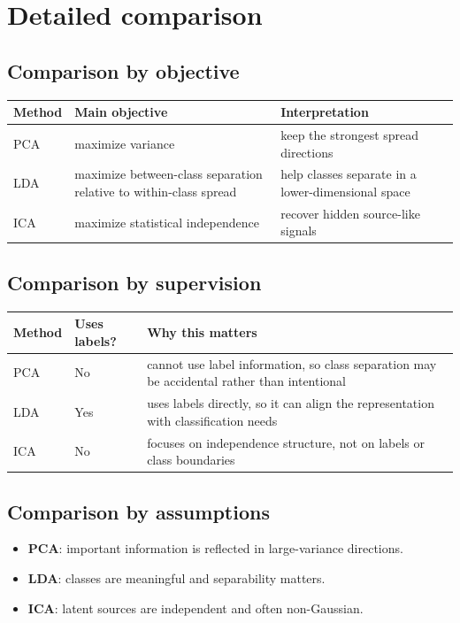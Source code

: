 \documentclass[11pt]{article}
\begin{document}
\section{Detailed comparison}
\subsection{Comparison by objective}
\begin{center}
\begin{tabular}{p{2.2cm}p{5.2cm}p{5.2cm}}
\toprule
\textbf{Method} & \textbf{Main objective} & \textbf{Interpretation} \\
\midrule
PCA & maximize variance & keep the strongest spread directions \\
LDA & maximize between-class separation relative to within-class spread & help classes separate in a lower-dimensional space \\
ICA & maximize statistical independence & recover hidden source-like signals \\
\bottomrule
\end{tabular}
\end{center}

\subsection{Comparison by supervision}
\begin{center}
\begin{tabular}{p{2.2cm}p{2.5cm}p{7.9cm}}
\toprule
\textbf{Method} & \textbf{Uses labels?} & \textbf{Why this matters} \\
\midrule
PCA & No & cannot use label information, so class separation may be accidental rather than intentional \\
LDA & Yes & uses labels directly, so it can align the representation with classification needs \\
ICA & No & focuses on independence structure, not on labels or class boundaries \\
\bottomrule
\end{tabular}
\end{center}

\subsection{Comparison by assumptions}
\begin{itemize}[leftmargin=*]
  \item \textbf{PCA}: important information is reflected in large-variance directions.
  \item \textbf{LDA}: classes are meaningful and separability matters.
  \item \textbf{ICA}: latent sources are independent and often non-Gaussian.
\end{itemize}
\end{document}
